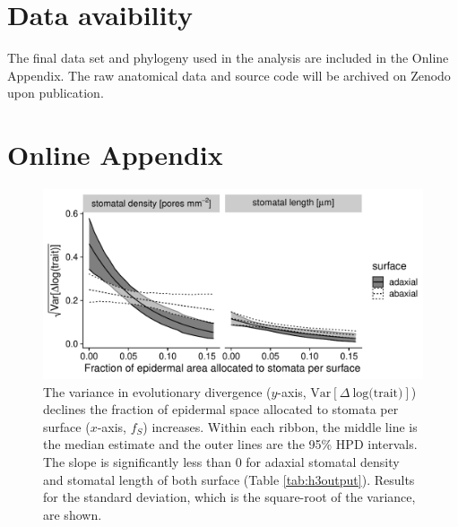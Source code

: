 \documentclass[
  12pt,
]{article}
\begin{document}
\hypertarget{data-avaibility}{%
\section{Data avaibility}\label{data-avaibility}}

The final data set and phylogeny used in the analysis are included in the Online Appendix. The raw anatomical data and source code will be archived on Zenodo upon publication.

\clearpage

\hypertarget{online-appendix}{%
\section{Online Appendix}\label{online-appendix}}

\renewcommand\thefigure{A\arabic{figure}}    
\renewcommand\thetable{A\arabic{table}}    
\renewcommand\theequation{A\arabic{equation}}    
\setcounter{figure}{0}    
\setcounter{table}{0}    
\setcounter{equation}{0}

\begin{figure}[ht]
\includegraphics[width=\textwidth]{../figures/fs-sigma.pdf}
\caption{The variance in evolutionary divergence ($y$-axis, $\textrm{Var}[\Delta~\textrm{log(trait)}]$) declines the fraction of epidermal space allocated to stomata per surface ($x$-axis, $f_S$) increases. Within each ribbon, the middle line is the median estimate and the outer lines are the 95\% HPD intervals. The slope is significantly less than 0 for adaxial stomatal density and stomatal length of both surface (Table \ref{tab:h3output}). Results for the standard deviation, which is the square-root of the variance, are shown.}
\label{fig:fs-sigma}
\end{figure}
\end{document}
